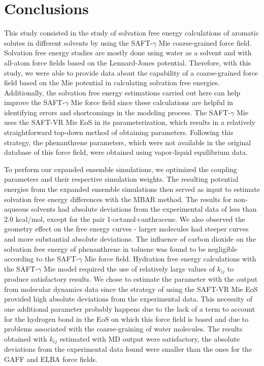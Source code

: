 \documentclass[final,12p,times,twocolumn]{elsarticle}
\begin{document}
	\section{Conclusions}
This study consisted in the study of solvation free energy calculations of aromatic solutes in different solvents by using the SAFT-$\gamma$ Mie coarse-grained force field. Solvation free energy studies are mostly done using water as a solvent and with all-atom force fields based on the Lennard-Jones potential. Therefore, with this study, we were able to provide data about the capability of a coarse-grained force field based on the Mie potential in calculating solvation free energies. Additionally, the solvation free energy estimations carried out here can help improve the SAFT-$\gamma$  Mie force field since these calculations are helpful in identifying errors and shortcomings in the modeling process. The SAFT-$\gamma$ Mie uses the SAFT-VR Mie EoS in its parameterization, which results in a relatively straightforward top-down method of obtaining parameters. Following this strategy, the phenanthrene parameters, which were not available in the original database of this force field, were obtained using vapor-liquid equilibrium data.

To perform our expanded ensemble simulations, we optimized the coupling parameters and their respective simulation weights. The resulting potential energies from the expanded ensemble simulations then served as input to estimate solvation free energy differences with the MBAR method. The results for non-aqueous solvents had absolute deviations from the experimental
data of less than 2.0 kcal/mol, except for the pair 1-octanol+anthracene. We also observed the geometry effect on the free energy curves - larger molecules had steeper curves and more substantial absolute deviations. The influence of carbon dioxide on the solvation free energy of phenanthrene in toluene was found to be negligible according to the SAFT-$\gamma$ Mie force field. Hydration free energy calculations with the SAFT-$\gamma$ Mie model required the use of relatively large values of $k_{ij}$ to produce satisfactory results. We chose to estimate the parameter with the output from molecular dynamics data since the strategy of using the SAFT-VR Mie EoS provided high absolute deviations from the experimental data. This necessity of one additional parameter probably happens due to the lack of a term to account for the hydrogen bond in the EoS on which this force field is based and due to problems associated with the coarse-graining of water molecules. The results obtained with $k_{ij}$ estimated with MD output were satisfactory, the absolute deviations from the experimental data found were smaller than the ones for the GAFF and ELBA force fields.
\end{document}
